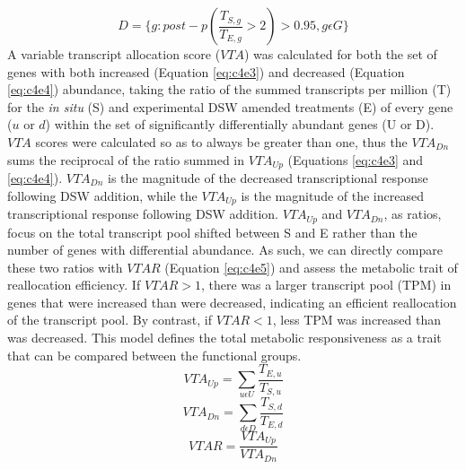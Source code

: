 \begin{equation}
	\label{eq:c4e2}
	 D = \{g : post-p(\frac{T_{S,g}}{T_{E,g}} > 2) > 0.95, g \epsilon G\}
\end{equation}
A variable transcript allocation score ($VTA$) was calculated for both the set of genes with both increased (Equation \ref{eq:c4e3}) and decreased (Equation \ref{eq:c4e4}) abundance, taking the ratio of the summed transcripts per million (T) for the \textit{in situ} (S) and experimental DSW amended treatments (E) of every gene ($u$ or $d$) within the set of significantly differentially abundant genes (U or D). $VTA$ scores were calculated so as to always be greater than one, thus the $VTA_{Dn}$ sums the reciprocal of the ratio summed in $VTA_{Up}$ (Equations \ref{eq:c4e3} and \ref{eq:c4e4}). $VTA_{Dn}$ is the magnitude of the decreased transcriptional response following DSW addition, while the $VTA_{Up}$ is the magnitude of the increased transcriptional response following DSW addition. $VTA_{Up}$ and $VTA_{Dn}$, as ratios, focus on the total transcript pool shifted between S and E rather than the number of genes with differential abundance. As such, we can directly compare these two ratios with $VTAR$ (Equation \ref{eq:c4e5}) and assess the metabolic trait of reallocation efficiency. If $VTAR > 1$, there was a larger transcript pool (TPM) in genes that were increased than were decreased, indicating an efficient reallocation of the transcript pool. By contrast, if $VTAR < 1$, less TPM was increased than was decreased. This model defines the total metabolic responsiveness as a trait that can be compared between the functional groups. 
\begin{equation}
	\label{eq:c4e3}
	VTA_{Up} = \sum_{u\epsilon U} \frac{T_{E,u}}{T_{S,u}}
\end{equation}
\begin{equation}
	\label{eq:c4e4}
	VTA_{Dn} = \sum_{d\epsilon D} \frac{T_{S,d}}{T_{E,d}}
\end{equation}
\begin{equation}
	\label{eq:c4e5}
	VTAR = \frac{VTA_{Up}}{VTA_{Dn}}
\end{equation}

